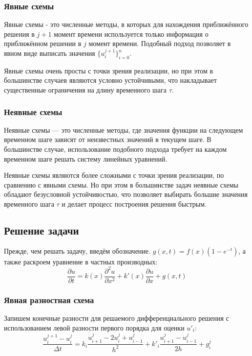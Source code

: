 \documentclass[12pt]{article}%
\begin{document}
\subsubsection{Явные схемы}
Явные схемы - это численные методы, в которых для нахождения приближённого решения в $j+1$ момент времени используется только информация о приближённом решении в $j$ момент времени. Подобный подход позволяет в явном виде выписать значения $\{u_i^{j+1}\}^n_{i=0}$.

Явные схемы очень просты с точки зрения реализации, но при этом в большинстве случаев являются условно устойчивыми, что накладывает существенные ограничения на длину временного шага $\tau$.


\subsubsection{Неявные схемы}
Неявные схемы — это численные методы, где значения функции на следующем временном шаге зависят от неизвестных значений в текущем шаге. В большинстве случае, использование подобного подхода требует на каждом временном шаге решать систему линейных уравнений.

Неявные схемы являются более сложными с точки зрения реализации, по сравнению с явными схемы. Но при этом в большинстве задач неявные схемы обладают безусловной устойчивостью, что позволяет выбирать большие значения временного шага $\tau$ и делает процесс построения решения быстрым.

\subsection{Решение задачи}
Прежде, чем решать задачу, введём обозначение. $g(x, t) = f(x) (1 - e^{-t})$, а также раскроем уравнение в частных производных:
\begin{equation*}
    \frac{\partial{u}}{\partial{t}} = k(x) \frac{\partial^2{u}}{\partial{x}^2} + k'(x) \frac{\partial{u}}{\partial{x}} + g(x, t)
\end{equation*}

\subsubsection{Явная разностная схема}
Запишем конечные разности для решаемого дифференциального решения с использованием левой разности первого порядка для оценки $u'_t$:
\begin{equation*}
    \frac{u_i^{j+1} - u_i^{j}}{\Delta t} = 
    k_i \frac{u^j_{i+1} - 2u^j_i + u^j_{i-1}}{h^2} +
    k'_i \frac{u^j_{i+1} - u^j_{i-1}}{2h} + g^j_i
\end{equation*}
\end{document}
